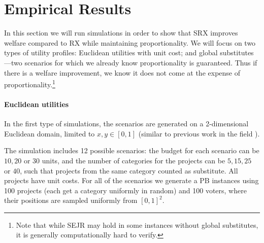 \documentclass[runningheads]{llncs}
\newcommand{\kibitz}[2]{\ifnum\Comments=1{\color{#1}{#2}}\fi}
\newcommand{\rmr}[1]{\kibitz{red}{[Reshef says:#1]}}
\newcommand{\rf}[1]{\kibitz{blue}{[Roy says:#1]}}
\begin{document}
    \section{Empirical Results}\label{sec:exp}\rmr{does it make sense to compare against more algorithms like you did in the other paper?}\rf{It is partially make sense. First to compare to other voting rules, we need to decide a way to exhaust the budget, we can use $\epsilon$-SRX at the start. However, the main problem is that we don't have any other voting rule that take substitutes into account. So as in the review, they will claim it make sense for SRX to have the highest welfare if we don't take into account subtitutes.}
In this section we will run simulations in order to show that SRX improves welfare compared to RX while maintaining proportionality.
We will focus on two types of utility profiles: Euclidean utilities with unit cost; and global substitutes---two scenarios for which we already know proportionality is guaranteed. Thus if there is a welfare improvement, we know it does not come at the expense of proportionality.\footnote{Note that while SEJR may hold in some instances without global substitutes, it is generally computationally hard to verify.}



\paragraph{Euclidean utilities}
In the first type of simulations, the scenarios are generated on a 2-dimensional Euclidean domain, limited to $x,y\in [0,1]$ (similar to previous work in the field \cite{talmon2019framework, skowron2020participatory}).%
 
 The simulation includes  12 possible scenarios: the budget  for each scenario can be $10, 20$ or $30$ units, and the number of  categories for the projects can be  $5,15,25$ or $40$, such that projects from the same category counted as substitute. 
  All projects have unit costs. For all of the scenarios we generate a PB instances using 100 projects (each get a category uniformly in random) and 100 voters, where their positions  are sampled uniformly from $[0,1]^2$.
\end{document}
